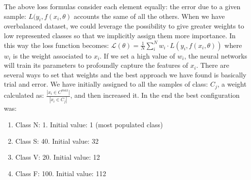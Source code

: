 \documentclass[LaM,binding=0.6cm]{sapthesis}
\begin{document}
The above loss formulas consider each element equally: the error due to a given sample: $L(y_i,f(x_i,\theta)$ accounts the same of all the others. When we have overbalanced dataset, we could leverage the possibility to give greater weights to low represented classes so that we implicitly assign them more importance. In this way the loss function becomes: $\mathcal{L}(\theta)=\frac{1}{N}\sum_{i}^{N}w_i\cdot L(y_i,f(x_i,\theta))$ where $w_i$ is the weight associated to $x_i$. If we set a high value of $w_i$, the neural networks will train its parameters to profoundly capture the features of $x_i$. There are several ways to set that weights and the best approach we have found is basically trial and error. We have initially assigned to all the samples of class: $C_j$, a weight calculated as: $\frac{\left|x_i\in C^{max}\right|}{\left|x_i\in C_j\right|}$, and then increased it. In the end the best configuration was:
\begin{enumerate}
\item Class N: 1. Initial value: 1 (most populated class)
\item Class S: 40. Initial value: 32
\item Class V: 20. Initial value: 12
\item Class F: 100. Initial value: 112 
\end{enumerate}
\end{document}

